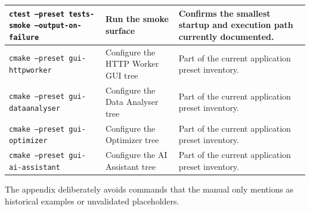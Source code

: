 \begin{table}[htbp]
\begin{tabular}{|p{3.2cm}|p{4.2cm}|p{4.5cm}|}
\hline
\texttt{ctest --preset tests-smoke --output-on-failure} & Run the smoke surface & Confirms the smallest startup and execution path currently documented. \index{tests-smoke!CTest} \\
\hline
\texttt{cmake --preset gui-httpworker} & Configure the HTTP Worker GUI tree & Part of the current application preset inventory. \index{gui-httpworker} \\
\hline
\texttt{cmake --preset gui-dataanalyser} & Configure the Data Analyser tree & Part of the current application preset inventory. \index{gui-dataanalyser} \\
\hline
\texttt{cmake --preset gui-optimizer} & Configure the Optimizer tree & Part of the current application preset inventory. \index{gui-optimizer} \\
\hline
\texttt{cmake --preset gui-ai-assistant} & Configure the AI Assistant tree & Part of the current application preset inventory. \index{gui-ai-assistant} \\
\hline
\end{tabular}
\end{table}

The appendix deliberately avoids commands that the manual only mentions as
historical examples or unvalidated placeholders.

